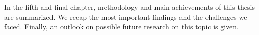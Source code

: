 In the fifth and final chapter, methodology and main achievements of this thesis are summarized. We recap the most important findings and the challenges we faced. Finally, an outlook on possible future research on this topic is given.